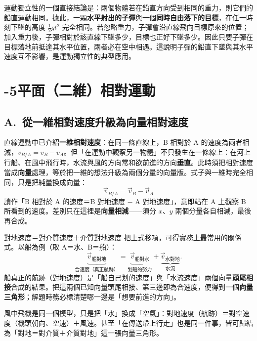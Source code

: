 \documentclass[11pt]{article}
\begin{document}
\medskip
運動獨立性的一個直接結論是：兩個物體若在鉛直方向受到相同的重力，則它們的鉛直運動相同。據此，一顆\textbf{水平射出的子彈}與一個\textbf{同時自由落下的目標}，在任一時刻下墜的高度 $\tfrac12 g t^2$ 完全相同。若忽略重力，子彈會沿直線飛向目標原來的位置；加入重力後，子彈相對於該直線下墜多少，目標也正好下墜多少。因此只要子彈在目標落地前抵達其水平位置，兩者必在空中相遇。這說明子彈的鉛直下墜與其水平速度互不影響，是運動獨立性的典型應用。


\section*{-5\quad 平面（二維）相對運動}

\subsection*{\sffamily A.\ 從一維相對速度升級為向量相對速度}

直線運動中已介紹\textbf{一維相對速度}：在同一條直線上，B 相對於 A 的速度為兩者相減，$v_{B/A}=v_B-v_A$。但「在運動中觀察另一物體」不只發生在一條線上：在河上行船、在風中飛行時，水流與風的方向常和欲前進的方向\textbf{垂直}。此時須把相對速度當成\textbf{向量}處理，等於把一維的想法升級為兩個分量的向量版。式子與一維時完全相同，只是把純量換成向量：
$$\boxed{\;\vec v_{B/A}=\vec v_B-\vec v_A\;}$$
讀作「B 相對於 A 的速度＝B 對地速度 $-$ A 對地速度」，意即站在 A 上觀察 B 所看到的速度。差別只在這裡是\textbf{向量相減}——須分 $x$、$y$ 兩個分量各自相減，最後再合成。

\begin{補充框}{對地速度＝對介質速度＋介質對地速度}
把上式移項，可得實務上最常用的關係式。以船為例（取 A＝水、B＝船）：
$$\underbrace{\vec v_{\text{船對地}}}_{\text{合速度（真正航跡）}}=\underbrace{\vec v_{\text{船對水}}}_{\text{划船的努力}}+\underbrace{\vec v_{\text{水對地}}}_{\text{水流}}.$$
船真正的航跡（對地速度）是「船自己划的速度」與「水流速度」兩個向量\textbf{頭尾相接}合成的結果。把這兩個已知向量頭尾相接、第三邊即為合速度，便得到一個\textbf{向量三角形}；解題時務必標清楚哪一邊是「想要前進的方向」。

風中飛機是同一個模型，只是把「水」換成「空氣」：對地速度（航跡）＝對空速度（機頭朝向、空速）＋風速。甚至「在傳送帶上行走」也是同一件事，皆可歸結為「對地＝對介質＋介質對地」這一張向量三角形。
\end{補充框}
\end{document}
